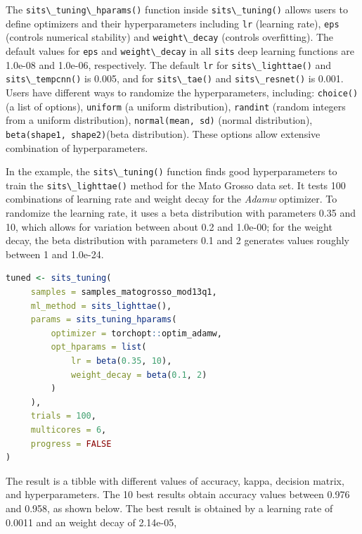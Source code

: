 \documentclass[
  11pt,
]{report}
\newcommand{\passthrough}[1]{#1}
\begin{document}
The \passthrough{\lstinline!sits\_tuning\_hparams()!} function inside
\passthrough{\lstinline!sits\_tuning()!} allows users to define
optimizers and their hyperparameters including
\passthrough{\lstinline!lr!} (learning rate),
\passthrough{\lstinline!eps!} (controls numerical stability) and
\passthrough{\lstinline!weight\_decay!} (controls overfitting). The
default values for \passthrough{\lstinline!eps!} and
\passthrough{\lstinline!weight\_decay!} in all
\passthrough{\lstinline!sits!} deep learning functions are 1.0e-08 and
1.0e-06, respectively. The default \passthrough{\lstinline!lr!} for
\passthrough{\lstinline!sits\_lighttae()!} and
\passthrough{\lstinline!sits\_tempcnn()!} is 0.005, and for
\passthrough{\lstinline!sits\_tae()!} and
\passthrough{\lstinline!sits\_resnet()!} is 0.001. Users have different
ways to randomize the hyperparameters, including:
\passthrough{\lstinline!choice()!} (a list of options),
\passthrough{\lstinline!uniform!} (a uniform distribution),
\passthrough{\lstinline!randint!} (random integers from a uniform
distribution), \passthrough{\lstinline!normal(mean, sd)!} (normal
distribution), \passthrough{\lstinline!beta(shape1, shape2)!}(beta
distribution). These options allow extensive combination of
hyperparameters.

In the example, the \passthrough{\lstinline!sits\_tuning()!} function
finds good hyperparameters to train the
\passthrough{\lstinline!sits\_lighttae()!} method for the Mato Grosso
data set. It tests 100 combinations of learning rate and weight decay
for the \emph{Adamw} optimizer. To randomize the learning rate, it uses
a beta distribution with parameters 0.35 and 10, which allows for
variation between about 0.2 and 1.0e-00; for the weight decay, the beta
distribution with parameters 0.1 and 2 generates values roughly between
1 and 1.0e-24.

\begin{lstlisting}[language=R]
tuned <- sits_tuning(
     samples = samples_matogrosso_mod13q1,
     ml_method = sits_lighttae(),
     params = sits_tuning_hparams(
         optimizer = torchopt::optim_adamw,
         opt_hparams = list(
             lr = beta(0.35, 10),
             weight_decay = beta(0.1, 2)
         )
     ),
     trials = 100,
     multicores = 6,
     progress = FALSE
)
\end{lstlisting}

The result is a tibble with different values of accuracy, kappa,
decision matrix, and hyperparameters. The 10 best results obtain
accuracy values between 0.976 and 0.958, as shown below. The best result
is obtained by a learning rate of 0.0011 and an weight decay of
2.14e-05,
\end{document}

